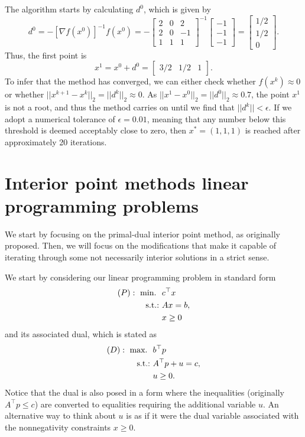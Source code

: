 	The algorithm starts by calculating $d^0$, which is given by
	$$
	d^0 = -[\nabla f(x^0)]^{-1}f(x^0) = - \begin{bmatrix} 2 & 0 & 2 \\ 2 & 0 & -1 \\ 1 & 1 & 1\end{bmatrix}^{-1}\begin{bmatrix} -1 \\ -1 \\ -1 \end{bmatrix} = \begin{bmatrix} 1/2 \\ 1/2 \\ 0 \end{bmatrix}.
	$$ 
	Thus, the first point is 
	$$
	x^1 = x^0 + d^0 = \begin{bmatrix} 3/2 & 1/2 & 1\end{bmatrix}.
	$$ 
	To infer that the method has converged, we can either check whether $f(x^k) \approx 0$ or whether $||x^{k+1} - x^{k}||_2 = || d^{k} ||_2 \approx 0$. As $||x^1 - x^0||_2 = || d^0 ||_2 \approx 0.7$, the point $x^1$ is not a root, and thus the method carries on until we find that $|| d^k|| < \epsilon$. If we adopt a numerical tolerance of $\epsilon = 0.01$, meaning that any number below this threshold is deemed acceptably close to zero, then $x^* = (1, 1, 1)$ is reached after approximately 20 iterations.	

\section{Interior point methods linear programming problems}
	
We start by focusing on the primal-dual interior point method, as originally proposed. Then, we will focus on the modifications that make it capable of iterating through some not necessarily interior solutions in a strict sense. 	

We start by considering our linear programming problem in standard form 
	\begin{align*}
		(P) :~ \mathop{\text{min.~}} \ &c^\top x \\
		\mathop{\text{s.t.:~}} &Ax = b,  \\
		&x \ge 0 
	\end{align*}
	and its associated dual, which is stated as
	\begin{align*}
		(D) :~ \mathop{\text{max.~}} \ &b^\top p \\
		\mathop{\text{s.t.:~}} &A^\top p + u = c, \\
		&u \ge 0. 
	\end{align*}
	Notice that the dual is also posed in a form where the inequalities (originally $A^\top p \le c$) are converted to equalities requiring the additional variable $u$. An alternative way to think about $u$ is as if it were the dual variable associated with the nonnegativity constraints $x \ge 0$. 
	
